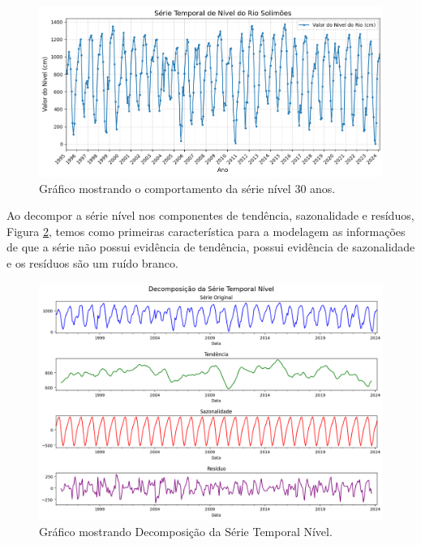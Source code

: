 \documentclass[ 12pt,a4paper ]{article} %
\begin{document}
	\begin{figure}[h!]
		\centering %
		\includegraphics[width=1.0\textwidth]{nivel.png} %
		\caption{Gráfico mostrando o comportamento da série nível 30 anos.} %
		\label{fig1} %
	\end{figure}
	
	Ao decompor a série nível nos componentes de tendência, sazonalidade e resíduos, Figura \ref{fig2}, temos como primeiras característica para a modelagem as informações de que a série não possui evidência de tendência, possui evidência de sazonalidade e os resíduos são um ruído branco.
	 
	 \begin{figure}[h!]
	 	\centering %
	 	\includegraphics[width=1.0\textwidth]{decomposicao.png} %
	 	\caption{Gráfico mostrando Decomposição da Série Temporal Nível.} %
	 	\label{fig2} %
	 \end{figure}
	 
\end{document}
